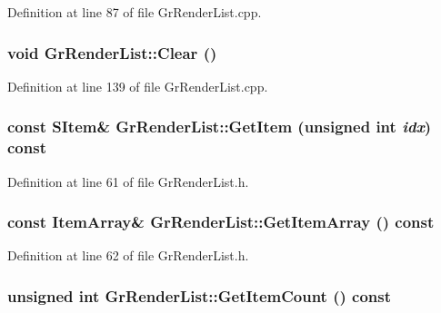 Definition at line 87 of file GrRenderList.cpp.\hypertarget{class_gr_render_list_a7f961a2ec3cfc7bebf4ee7157569081}{
\subsubsection[{Clear}]{\setlength{\rightskip}{0pt plus 5cm}void GrRenderList::Clear ()}}
\label{class_gr_render_list_a7f961a2ec3cfc7bebf4ee7157569081}




Definition at line 139 of file GrRenderList.cpp.\hypertarget{class_gr_render_list_804dda30bc32373cf54e59cb6442bc53}{
\subsubsection[{GetItem}]{\setlength{\rightskip}{0pt plus 5cm}const {\bf SItem}\& GrRenderList::GetItem (unsigned int {\em idx}) const}}
\label{class_gr_render_list_804dda30bc32373cf54e59cb6442bc53}




Definition at line 61 of file GrRenderList.h.\hypertarget{class_gr_render_list_784632f8e1b0b09ae34f2ccb06c3fac3}{
\subsubsection[{GetItemArray}]{\setlength{\rightskip}{0pt plus 5cm}const {\bf ItemArray}\& GrRenderList::GetItemArray () const}}
\label{class_gr_render_list_784632f8e1b0b09ae34f2ccb06c3fac3}




Definition at line 62 of file GrRenderList.h.\hypertarget{class_gr_render_list_eb7629d3dfeedc0b4506fe89805626ca}{
\subsubsection[{GetItemCount}]{\setlength{\rightskip}{0pt plus 5cm}unsigned int GrRenderList::GetItemCount () const}}
\label{class_gr_render_list_eb7629d3dfeedc0b4506fe89805626ca}




